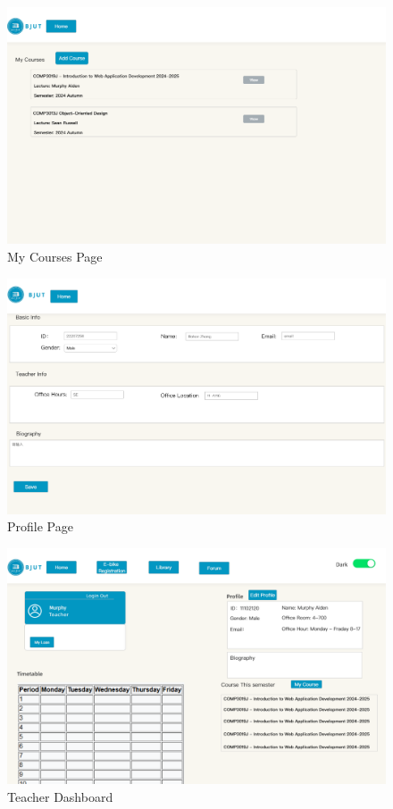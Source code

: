 \documentclass[12pt]{article}
\begin{document}
\begin{figure}[H]
    \centering
    \includegraphics[width=\textwidth]{mockups/teacher/mycourses.png}
    \caption{My Courses Page}
    \label{fig:teacher_mycourses_page}
\end{figure}

\begin{figure}[H]
    \centering
    \includegraphics[width=\textwidth]{mockups/teacher/profile.png}
    \caption{Profile Page}
    \label{fig:teacher_profile_page}
\end{figure}

\begin{figure}[H]
    \centering
    \includegraphics[width=\textwidth]{mockups/teacher/teacherdash.png}
    \caption{Teacher Dashboard}
    \label{fig:teacher_dashboard_page}
\end{figure}
\end{document}
